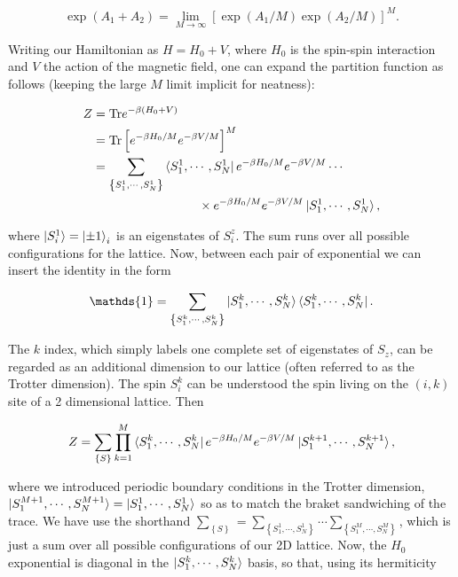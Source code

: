 \documentclass[11pt,openany]{article}
\begin{document}
\begin{equation}
	\exp\left(A_1+A_2\right) =  \lim_{M\to\infty}\left[\exp\left(A_1/M\right)\exp\left(A_2/M\right)\right]^M.
\end{equation}

Writing our Hamiltonian as $H = H_0 + V$, where $H_0$ is the spin-spin interaction and $V$ the action of the magnetic field, one can expand the partition function as follows (keeping the large $M$ limit implicit for neatness):

\begin{align*}
	Z &= \mathrm{Tr}e^{-\beta\left(H_0+V\right)}\\
	&= \mathrm{Tr}\left[e^{-\beta H_0/M}e^{-\beta V/M}\right]^M\\
	&= \sum_{\left\{S^1_1,\cdots,S^1_N\right\}}\bra{S^1_1,\cdots,S^1_N}e^{-\beta H_0/M}e^{-\beta V/M}\cdots\\
	&\hspace{3cm}\times e^{-\beta H_0/M}e^{-\beta V/M}\ket{S^1_1,\cdots,S^1_N},
\end{align*}

where $\ket{S_i^1} = \ket{\pm1}_i$ is an eigenstates of $S_i^z$. The sum runs over all possible configurations for the lattice. Now, between each pair of exponential we can insert the identity in the form

\begin{equation}
	\mathds{1} = \sum_{\left\{S^k_1,\cdots,S^k_N\right\}}\ket{S^k_1,\cdots,S^k_N}\bra{S^k_1,\cdots,S^k_N}.
\end{equation}

The $k$ index, which simply labels one complete set of eigenstates of $S_z$, can be regarded as an additional dimension to our lattice (often referred to as the Trotter dimension). The spin $S_i^k$ can be understood the spin living on the $(i,k)$ site of a 2 dimensional lattice. Then

\begin{equation}
	Z = \sum_{\left\{S\right\}}\prod_{k=1}^M\bra{S^k_1,\cdots,S^k_N}e^{-\beta H_0/M}e^{-\beta V/M}\ket{S^{k+1}_1,\cdots,S^{k+1}_N},
\end{equation}

where we introduced periodic boundary conditions in the Trotter dimension, $\ket{S^{M+1}_1,\cdots,S^{M+1}_N} = \ket{S^1_1,\cdots,S^1_N}$ so as to match the braket sandwiching of the trace. We have use the shorthand $\sum_{\left\{S\right\}} = \sum_{\left\{S_1^1,\cdots,S_N^1\right\}}\cdots\sum_{\left\{S_1^M,\cdots,S_N^M\right\}}$, which is just a sum over all possible configurations of our 2D lattice. Now, the $H_0$ exponential is diagonal in the $\ket{S^k_1,\cdots,S^k_N}$ basis, so that, using its hermiticity
\end{document}
